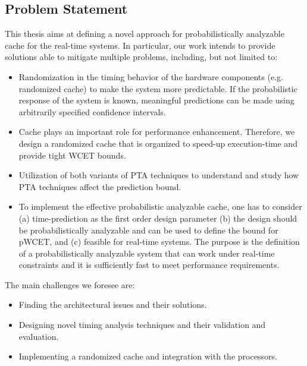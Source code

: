 \subsection{Problem Statement}
This thesis aims at defining a novel approach for probabilistically analyzable cache for the real-time systems. In particular, our work intends to provide solutions able to mitigate multiple problems, including, but not limited to:

\begin{itemize}

\item{Randomization in the timing behavior of the hardware components (e.g. randomized cache) to make the system more predictable. If the probabilistic response of the system is known, meaningful predictions can be made using arbitrarily specified confidence intervals}.

\item{Cache plays an important role for performance enhancement. Therefore, we design a randomized cache that is organized to speed-up execution-time and provide tight WCET bounds}.
\item{Utilization of both variants of PTA techniques to understand and study how PTA techniques affect the prediction bound}.
\item{To implement the effective probabilistic analyzable cache, one has to consider (a) time-prediction as the first order design parameter (b) the design should be probabilistically analyzable and can be used to define the bound for pWCET, and (c) feasible for real-time systems. The purpose is the definition of a probabilistically analyzable system that can work under real-time constraints and it is sufficiently fast to meet performance requirements}.
 
\end{itemize}

The main challenges we foresee are: 
\begin{itemize} 
\item{Finding the architectural issues and their solutions}.
 \item{Designing novel timing analysis techniques and their validation and evaluation}.
 \item{Implementing a randomized cache and integration with the processors}.


\end{itemize} 

